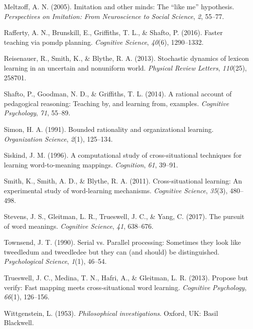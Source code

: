 \documentclass[english,,man,floatsintext]{apa6}
\begin{document}
\leavevmode\hypertarget{ref-meltzoff2005}{}%
Meltzoff, A. N. (2005). Imitation and other minds: The ``like me'' hypothesis. \emph{Perspectives on Imitation: From Neuroscience to Social Science}, \emph{2}, 55--77.

\leavevmode\hypertarget{ref-rafferty2016}{}%
Rafferty, A. N., Brunskill, E., Griffiths, T. L., \& Shafto, P. (2016). Faster teaching via pomdp planning. \emph{Cognitive Science}, \emph{40}(6), 1290--1332.

\leavevmode\hypertarget{ref-reisenauer2013}{}%
Reisenauer, R., Smith, K., \& Blythe, R. A. (2013). Stochastic dynamics of lexicon learning in an uncertain and nonuniform world. \emph{Physical Review Letters}, \emph{110}(25), 258701.

\leavevmode\hypertarget{ref-shafto2014}{}%
Shafto, P., Goodman, N. D., \& Griffiths, T. L. (2014). A rational account of pedagogical reasoning: Teaching by, and learning from, examples. \emph{Cognitive Psychology}, \emph{71}, 55--89.

\leavevmode\hypertarget{ref-simon1991}{}%
Simon, H. A. (1991). Bounded rationality and organizational learning. \emph{Organization Science}, \emph{2}(1), 125--134.

\leavevmode\hypertarget{ref-siskind1996}{}%
Siskind, J. M. (1996). A computational study of cross-situational techniques for learning word-to-meaning mappings. \emph{Cognition}, \emph{61}, 39--91.

\leavevmode\hypertarget{ref-smith2011}{}%
Smith, K., Smith, A. D., \& Blythe, R. A. (2011). Cross-situational learning: An experimental study of word-learning mechanisms. \emph{Cognitive Science}, \emph{35}(3), 480--498.

\leavevmode\hypertarget{ref-stevens2017}{}%
Stevens, J. S., Gleitman, L. R., Trueswell, J. C., \& Yang, C. (2017). The pursuit of word meanings. \emph{Cognitive Science}, \emph{41}, 638--676.

\leavevmode\hypertarget{ref-townsend1990}{}%
Townsend, J. T. (1990). Serial vs. Parallel processing: Sometimes they look like tweedledum and tweedledee but they can (and should) be distinguished. \emph{Psychological Science}, \emph{1}(1), 46--54.

\leavevmode\hypertarget{ref-trueswell2013}{}%
Trueswell, J. C., Medina, T. N., Hafri, A., \& Gleitman, L. R. (2013). Propose but verify: Fast mapping meets cross-situational word learning. \emph{Cognitive Psychology}, \emph{66}(1), 126--156.

\leavevmode\hypertarget{ref-wittgenstein1953}{}%
Wittgenstein, L. (1953). \emph{Philosophical investigations}. Oxford, UK: Basil Blackwell.
\end{document}
